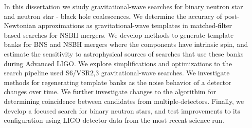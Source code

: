 
In this dissertation we study gravitational-wave searches for 
binary neutron star and neutron star - black hole coalescences. 
We determine the accuracy of post-Newtonian approximations as gravitational-wave
templates in matched-filter based searches for NSBH mergers.
We develop methods to generate template banks for BNS and NSBH mergers where
the components have intrinsic spin, and estimate the sensitivity to
astrophysical sources of searches that use these banks during Advanced LIGO.
We explore simplifications and optimizations to the search pipeline used 
S6/VSR2,3 gravitational-wave searches. We investigate methods for regenerating
template banks as the noise behavior of a detector changes over time. We further
investigate changes to the algorithim for determining coincidence between
candidates from multiple-detectors.
Finally, we develop a focused search for binary neutron stars, and test improvements
to its configuration using LIGO detector data from the most recent science
run.
